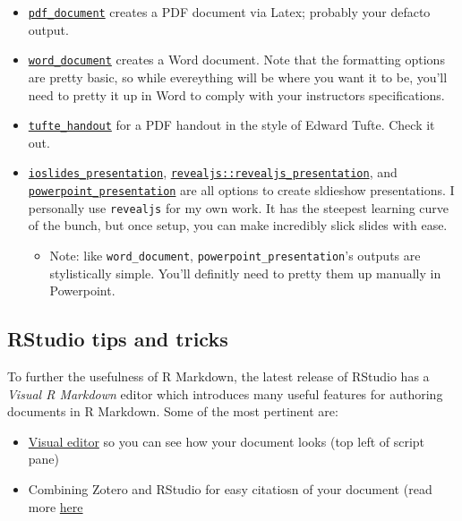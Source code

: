 \documentclass[
]{book}
\providecommand{\tightlist}{%
  \setlength{\itemsep}{0pt}\setlength{\parskip}{0pt}}
\begin{document}
\begin{itemize}
\tightlist
\item
  \href{https://bookdown.org/yihui/R\%20Markdown/pdf-document.html}{\texttt{pdf\_document}} creates a PDF document via Latex; probably your defacto output.
\item
  \href{https://bookdown.org/yihui/R\%20Markdown/word-document.html}{\texttt{word\_document}} creates a Word document. Note that the formatting options are pretty basic, so while evereything will be where you want it to be, you'll need to pretty it up in Word to comply with your instructors specifications.
\item
  \href{https://bookdown.org/yihui/R\%20Markdown/tufte-handouts.html}{\texttt{tufte\_handout}} for a PDF handout in the style of Edward Tufte. Check it out.
\item
  \href{https://bookdown.org/yihui/R\%20Markdown/ioslides-presentation.html}{\texttt{ioslides\_presentation}}, \href{https://bookdown.org/yihui/R\%20Markdown/ioslides-presentation.html}{\texttt{revealjs::revealjs\_presentation}}, and \href{https://bookdown.org/yihui/R\%20Markdown/powerpoint-presentation.html}{\texttt{powerpoint\_presentation}} are all options to create sldieshow presentations. I personally use \texttt{revealjs} for my own work. It has the steepest learning curve of the bunch, but once setup, you can make incredibly slick slides with ease.

  \begin{itemize}
  \tightlist
  \item
    Note: like \texttt{word\_document}, \texttt{powerpoint\_presentation}'s outputs are stylistically simple. You'll definitly need to pretty them up manually in Powerpoint.
  \end{itemize}
\end{itemize}

\hypertarget{rstudio-tips-and-tricks}{%
\subsection{RStudio tips and tricks}\label{rstudio-tips-and-tricks}}

To further the usefulness of R Markdown, the latest release of RStudio has a \emph{Visual R Markdown} editor which introduces many useful features for authoring documents in R Markdown. Some of the most pertinent are:

\begin{itemize}
\tightlist
\item
  \href{https://rstudio.github.io/visual-markdown-editing/}{Visual editor} so you can see how your document looks (top left of script pane)
\item
  Combining Zotero and RStudio for easy citatiosn of your document (read more \href{https://rstudio.github.io/visual-markdown-editing/citations.html}{here}
\end{itemize}
\end{document}
